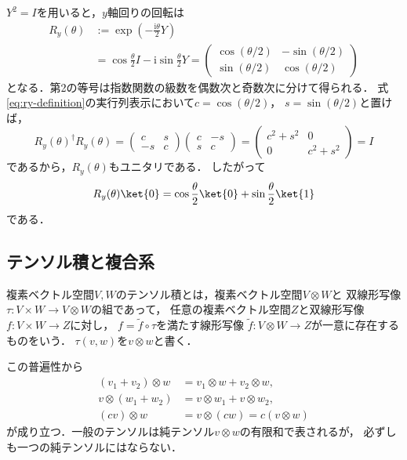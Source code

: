 $Y^2=I$を用いると，$y$軸回りの回転は
\begin{align}
  R_y(\theta)
  &:=\exp\left(-\frac{\mathrm{i}\theta}{2}Y\right)\\
  &=\cos\frac{\theta}{2}I-\mathrm{i}\sin\frac{\theta}{2}Y
   =\begin{pmatrix}
      \cos(\theta/2)&-\sin(\theta/2)\\
      \sin(\theta/2)& \cos(\theta/2)
    \end{pmatrix}
  \label{eq:ry-definition}
\end{align}
となる．第2の等号は指数関数の級数を偶数次と奇数次に分けて得られる．
式\eqref{eq:ry-definition}の実行列表示において$c=\cos(\theta/2)$，
$s=\sin(\theta/2)$と置けば，
\[
 R_y(\theta)^\dagger R_y(\theta)
 =\begin{pmatrix}c&s\\-s&c\end{pmatrix}
  \begin{pmatrix}c&-s\\s&c\end{pmatrix}
 =\begin{pmatrix}c^2+s^2&0\\0&c^2+s^2\end{pmatrix}=I
\]
であるから，$R_y(\theta)$もユニタリである．
したがって
\begin{equation}
  R_y(\theta)\ket{0}
  =\cos\frac{\theta}{2}\ket{0}
   +\sin\frac{\theta}{2}\ket{1}
  \label{eq:ry-on-zero}
\end{equation}
である．

\subsection{テンソル積と複合系}

\begin{defi}[ベクトル空間のテンソル積]
複素ベクトル空間$V,W$のテンソル積とは，複素ベクトル空間$V\otimes W$と
双線形写像$\tau:V\times W\to V\otimes W$の組であって，
任意の複素ベクトル空間$Z$と双線形写像$f:V\times W\to Z$に対し，
$f=\widetilde f\circ\tau$を満たす線形写像
$\widetilde f:V\otimes W\to Z$が一意に存在するものをいう．
$\tau(v,w)$を$v\otimes w$と書く．
\end{defi}

この普遍性から
\begin{align}
  (v_1+v_2)\otimes w&=v_1\otimes w+v_2\otimes w,\\
  v\otimes(w_1+w_2)&=v\otimes w_1+v\otimes w_2,\\
  (cv)\otimes w&=v\otimes(cw)=c(v\otimes w)
\end{align}
が成り立つ．一般のテンソルは純テンソル$v\otimes w$の有限和で表されるが，
必ずしも一つの純テンソルにはならない．

